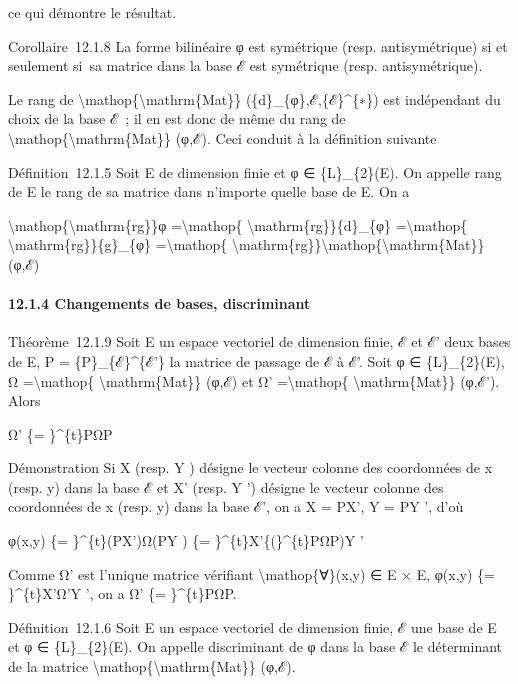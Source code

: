 \documentclass[]{article}
\begin{document}
ce qui démontre le résultat.

Corollaire~12.1.8 La forme bilinéaire φ est symétrique (resp.
antisymétrique) si et seulement si~sa matrice dans la base ℰ est
symétrique (resp. antisymétrique).

Le rang de \textbackslash{}mathop\{\textbackslash{}mathrm\{Mat\}\}
(\{d\}\_\{φ\},ℰ,\{ℰ\}\^{}\{∗\}) est indépendant du choix de la base ℰ~;
il en est donc de même du rang de
\textbackslash{}mathop\{\textbackslash{}mathrm\{Mat\}\} (φ,ℰ). Ceci
conduit à la définition suivante

Définition~12.1.5 Soit E de dimension finie et φ ∈ \{L\}\_\{2\}(E). On
appelle rang de E le rang de sa matrice dans n'importe quelle base de E.
On a

\textbackslash{}mathop\{\textbackslash{}mathrm\{rg\}\}φ
=\textbackslash{}mathop\{ \textbackslash{}mathrm\{rg\}\}\{d\}\_\{φ\}
=\textbackslash{}mathop\{ \textbackslash{}mathrm\{rg\}\}\{g\}\_\{φ\}
=\textbackslash{}mathop\{
\textbackslash{}mathrm\{rg\}\}\textbackslash{}mathop\{\textbackslash{}mathrm\{Mat\}\}
(φ,ℰ)

\paragraph{12.1.4 Changements de bases, discriminant}

Théorème~12.1.9 Soit E un espace vectoriel de dimension finie, ℰ et ℰ'
deux bases de E, P = \{P\}\_\{ℰ\}\^{}\{ℰ'\} la matrice de passage de ℰ à
ℰ'. Soit φ ∈ \{L\}\_\{2\}(E), Ω =\textbackslash{}mathop\{
\textbackslash{}mathrm\{Mat\}\} (φ,ℰ) et Ω' =\textbackslash{}mathop\{
\textbackslash{}mathrm\{Mat\}\} (φ,ℰ'). Alors

Ω' \{= \}\^{}\{t\}PΩP

Démonstration Si X (resp. Y ) désigne le vecteur colonne des coordonnées
de x (resp. y) dans la base ℰ et X' (resp. Y ') désigne le vecteur
colonne des coordonnées de x (resp. y) dans la base ℰ', on a X = PX', Y
= PY ', d'où

φ(x,y) \{= \}\^{}\{t\}(PX')Ω(PY ) \{= \}\^{}\{t\}X'\{(\}\^{}\{t\}PΩP)Y '

Comme Ω' est l'unique matrice vérifiant \textbackslash{}mathop\{∀\}(x,y)
∈ E × E, φ(x,y) \{= \}\^{}\{t\}X'Ω'Y ', on a Ω' \{= \}\^{}\{t\}PΩP.

Définition~12.1.6 Soit E un espace vectoriel de dimension finie, ℰ une
base de E et φ ∈ \{L\}\_\{2\}(E). On appelle discriminant de φ dans la
base ℰ le déterminant de la matrice
\textbackslash{}mathop\{\textbackslash{}mathrm\{Mat\}\} (φ,ℰ).
\end{document}
